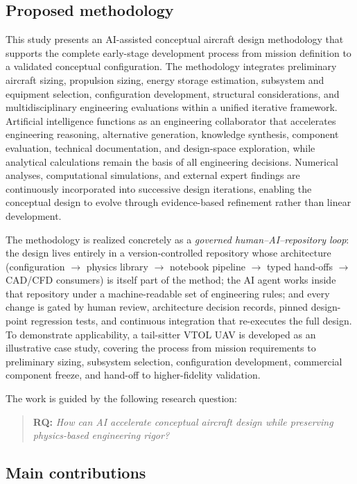 \subsection{Proposed methodology}

This study presents an AI-assisted conceptual aircraft design
methodology that supports the complete early-stage development process
from mission definition to a validated conceptual configuration. The
methodology integrates preliminary aircraft sizing, propulsion sizing,
energy storage estimation, subsystem and equipment selection,
configuration development, structural considerations, and
multidisciplinary engineering evaluations within a unified iterative
framework. Artificial intelligence functions as an engineering
collaborator that accelerates engineering reasoning, alternative
generation, knowledge synthesis, component evaluation, technical
documentation, and design-space exploration, while analytical
calculations remain the basis of all engineering decisions. Numerical
analyses, computational simulations, and external expert findings are
continuously incorporated into successive design iterations, enabling
the conceptual design to evolve through evidence-based refinement
rather than linear development.

The methodology is realized concretely as a \emph{governed
human--AI--repository loop}: the design lives entirely in a
version-controlled repository whose architecture (configuration
$\rightarrow$ physics library $\rightarrow$ notebook pipeline
$\rightarrow$ typed hand-offs $\rightarrow$ CAD/CFD consumers) is
itself part of the method; the AI agent works inside that repository
under a machine-readable set of engineering rules; and every change is
gated by human review, architecture decision records, pinned
design-point regression tests, and continuous integration that
re-executes the full design. To demonstrate applicability, a
tail-sitter VTOL UAV is developed as an illustrative case study,
covering the process from mission requirements to preliminary sizing,
subsystem selection, configuration development, commercial
component freeze, and hand-off to higher-fidelity validation.

The work is guided by the following research question:

\begin{quote}
\textbf{RQ:} \emph{How can AI accelerate conceptual aircraft design
while preserving physics-based engineering rigor?}
\end{quote}

\subsection{Main contributions}

